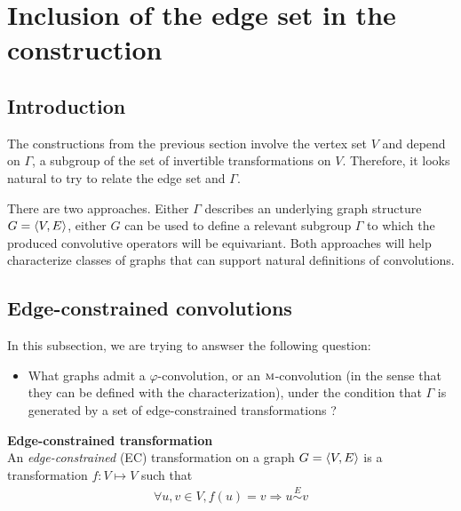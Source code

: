 \section{Inclusion of the edge set in the construction}
\label{sec:edges}

\subsection{Introduction}

The constructions from the previous section involve the vertex set $V$ and depend on $\Gamma$, a subgroup of the set of invertible transformations on $V$. Therefore, it looks natural to try to relate the edge set and $\Gamma$.

There are two approaches. Either $\Gamma$ describes an underlying graph structure $G = \langle V, E \rangle$, either $G$ can be used to define a relevant subgroup $\Gamma$ to which the produced convolutive operators will be equivariant. Both approaches will help characterize classes of graphs that can support natural definitions of convolutions.




\subsection{Edge-constrained convolutions}

In this subsection, we are trying to answser the following question:
\begin{itemize}
	\item What graphs admit a $\varphi$-convolution, or an $\operatorname{\textsc{m}}$-convolution (in the sense that they can be defined with the characterization), under the condition that $\Gamma$ is generated by a set of edge-constrained transformations ?
\end{itemize}

\begin{definition}\textbf{Edge-constrained transformation}\\
An \emph{edge-constrained} (EC) transformation on a graph $G = \langle V, E \rangle$ is a transformation $f: V \mapsto V$ such that
\begin{gather*}
\forall u,v \in V, f(u) = v \Rightarrow u \overset{E}{\sim} v
\end{gather*}
\end{definition}

